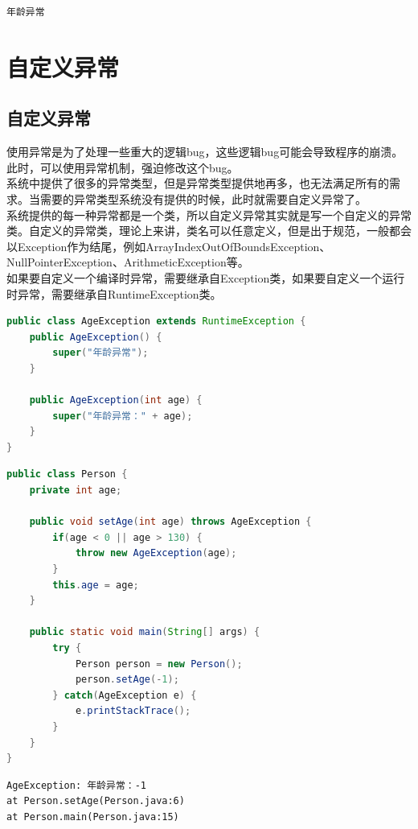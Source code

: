 \begin{tcolorbox}
    \begin{verbatim}
年龄异常
	\end{verbatim}
\end{tcolorbox}

\newpage

\section{自定义异常}

\subsection{自定义异常}

使用异常是为了处理一些重大的逻辑bug，这些逻辑bug可能会导致程序的崩溃。此时，可以使用异常机制，强迫修改这个bug。\\

系统中提供了很多的异常类型，但是异常类型提供地再多，也无法满足所有的需求。当需要的异常类型系统没有提供的时候，此时就需要自定义异常了。\\

系统提供的每一种异常都是一个类，所以自定义异常其实就是写一个自定义的异常类。自定义的异常类，理论上来讲，类名可以任意定义，但是出于规范，一般都会以Exception作为结尾，例如ArrayIndexOutOfBoundsException、NullPointerException、ArithmeticException等。\\

如果要自定义一个编译时异常，需要继承自Exception类，如果要自定义一个运行时异常，需要继承自RuntimeException类。\\


\begin{lstlisting}[language=Java]
public class AgeException extends RuntimeException {
    public AgeException() {
        super("年龄异常");
    }
    
    public AgeException(int age) {
        super("年龄异常：" + age);
    }
}
\end{lstlisting}

\begin{lstlisting}[language=Java]
public class Person {
    private int age;
    
    public void setAge(int age) throws AgeException {
        if(age < 0 || age > 130) {
            throw new AgeException(age);
        }
        this.age = age;
    }
    
    public static void main(String[] args) {
        try {
            Person person = new Person();
            person.setAge(-1);
        } catch(AgeException e) {
            e.printStackTrace();
        }
    }
}
\end{lstlisting}

\begin{tcolorbox}
    \begin{verbatim}
AgeException: 年龄异常：-1
at Person.setAge(Person.java:6)
at Person.main(Person.java:15)
	\end{verbatim}
\end{tcolorbox}

\newpage